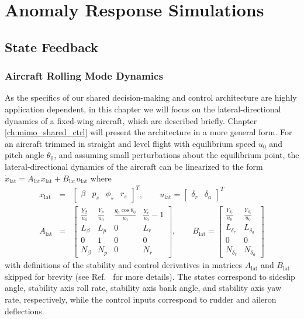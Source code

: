 \chapter{Anomaly Response Simulations}  \label{ch:numerical}
\section{State Feedback}

\subsection{Aircraft Rolling Mode Dynamics}
As the specifics of our shared decision-making and control architecture are highly application dependent, in this chapter we will focus on the lateral-directional dynamics of a fixed-wing aircraft, which are described briefly. Chapter \ref{ch:mimo_shared_ctrl} will present the architecture in a more general form. For an aircraft trimmed in straight and level flight with equilibrium speed $u_0$ and pitch angle $\theta_0$, and assuming small perturbations about the equilibrium point, the lateral-directional dynamics of the aircraft can be linearized to the form $\dot{x}_{\mathrm{lat}} = A_{\mathrm{lat}} x_{\mathrm{lat}} + B_{\mathrm{lat}} u_{\mathrm{lat}}$ where
\begin{eqnarray}
	x_{\mathrm{lat}} &=& \begin{bmatrix}\beta & p_s & \phi_s & r_s \end{bmatrix}^T, \qquad u_{\mathrm{lat}} = \begin{bmatrix}\delta_r & \delta_a \end{bmatrix}^T \nonumber \\
	A_{\mathrm{lat}} &=& \begin{bmatrix}
			\frac{Y_\beta}{u_0} & \frac{Y_p}{u_0} & \frac{g_0\cos{\theta_0}}{u_0} & \frac{Y_r}{u_0} - 1 \\
			L_\beta & L_p & 0 & L_r \\
			0 & 1 & 0 & 0 \\
			N_\beta & N_p & 0 & N_r
		\end{bmatrix}, \qquad B_{\mathrm{lat}} = \begin{bmatrix}
			\frac{Y_{\delta_r}}{u_0} & \frac{Y_{\delta_a}}{u_0} \\
			L_{\delta_r} & L_{\delta_a} \\
			0 & 0 \\
			N_{\delta_r} & N_{\delta_a} 
		\end{bmatrix}
\end{eqnarray}
\noindent with definitions of the stability and control derivatives in matrices $A_{\mathrm{lat}}$ and $B_{\mathrm{lat}}$ skipped for brevity (see Ref.~\cite{lavretsky2013robust} for more details). The states correspond to sideslip angle, stability axis roll rate, stability axis bank angle, and stability axis yaw rate, respectively, while the control inputs correspond to rudder and aileron deflections.

